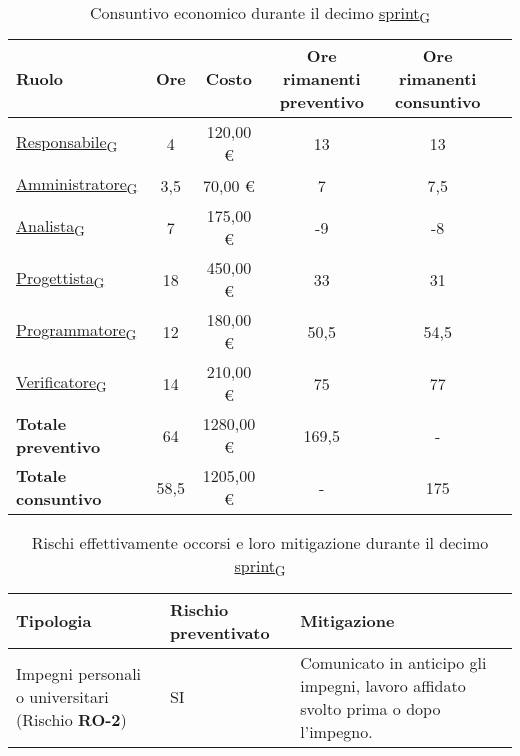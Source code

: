 \newpage
{}
\begin{table}[!h]
    \centering
    \begin{tabular}{ | l | c | c | c | c | c | }
        \hline
        \textbf{Ruolo} & \textbf{Ore} & \textbf{Costo} & \textbf{Ore rimanenti preventivo} & \textbf{Ore rimanenti consuntivo} \\
        \hline
        \href{https://7last.github.io/docs/rtb/documentazione-interna/glossario\#responsabile}{Responsabile\textsubscript{G}}     &  4   &  120,00 € &  13   &  13   \\
        \href{https://7last.github.io/docs/rtb/documentazione-interna/glossario\#amministratore}{Amministratore\textsubscript{G}} &  3,5 &   70,00 € &   7   &   7,5 \\
        \href{https://7last.github.io/docs/rtb/documentazione-interna/glossario\#analista}{Analista\textsubscript{G}}             &  7   &  175,00 € &  -9   &  -8   \\
        \href{https://7last.github.io/docs/rtb/documentazione-interna/glossario\#progettista}{Progettista\textsubscript{G}}       & 18   &  450,00 € &  33   &  31   \\
        \href{https://7last.github.io/docs/rtb/documentazione-interna/glossario\#programmatore}{Programmatore\textsubscript{G}}   & 12   &  180,00 € &  50,5 &  54,5 \\
        \href{https://7last.github.io/docs/rtb/documentazione-interna/glossario\#verificatore}{Verificatore\textsubscript{G}}     & 14   &  210,00 € &  75   &  77   \\
        \hline
        \textbf{Totale preventivo} & 64   & 1280,00 € & 169,5 &   -   \\
        \hline
        \textbf{Totale consuntivo} & 58,5 & 1205,00 € &   -   & 175   \\
        \hline
    \end{tabular}
    \caption{Consuntivo economico durante il decimo \href{https://7last.github.io/docs/rtb/documentazione-interna/glossario\#sprint}{sprint\textsubscript{G}}}
\end{table}

\begin{table}[!h]
    \centering
    \begin{tabular}{ | p{6cm} | p{2.5cm} | p{7.5cm} | }
        \hline
        \textbf{Tipologia} & \textbf{Rischio preventivato} & \textbf{Mitigazione}  \\
        \hline
        Impegni personali o universitari (Rischio \textbf{RO-2})& SI & Comunicato in anticipo gli impegni, lavoro affidato svolto prima o dopo l'impegno.\\
        \hline
    \end{tabular}
    \caption{Rischi effettivamente occorsi e loro mitigazione durante il decimo \href{https://7last.github.io/docs/rtb/documentazione-interna/glossario\#sprint}{sprint\textsubscript{G}}}
\end{table}

